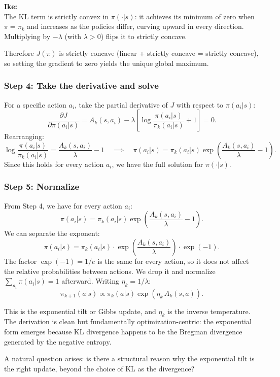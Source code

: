 \documentclass[11pt]{article}
\theoremstyle{definition}
\theoremstyle{remark}
\newenvironment{ike}{\color{blue}\textbf{Ike:}\\}{}
\begin{document}
\begin{ike}
The KL term is strictly convex in $\pi(\cdot|s)$: it achieves its minimum of zero when $\pi = \pi_k$ and increases as the policies differ, curving upward in every direction. Multiplying by $-\lambda$ (with $\lambda > 0$) flips it to strictly concave.

Therefore $J(\pi)$ is strictly concave (linear + strictly concave = strictly concave), so setting the gradient to zero yields the unique global maximum.

\subsubsection*{Step 4: Take the derivative and solve}

For a specific action $a_i$, take the partial derivative of $J$ with respect to $\pi(a_i|s)$:
\[
\frac{\partial J}{\partial \pi(a_i|s)} = A_k(s,a_i) - \lambda\left[\log \frac{\pi(a_i|s)}{\pi_k(a_i|s)} + 1\right] = 0.
\]
Rearranging:
\[
\log \frac{\pi(a_i|s)}{\pi_k(a_i|s)} = \frac{A_k(s,a_i)}{\lambda} - 1 \quad \implies \quad \pi(a_i|s) = \pi_k(a_i|s) \exp\!\left(\frac{A_k(s,a_i)}{\lambda} - 1\right).
\]
Since this holds for every action $a_i$, we have the full solution for $\pi(\cdot|s)$.

\subsubsection*{Step 5: Normalize}

From Step 4, we have for every action $a_i$:
\[
\pi(a_i|s) = \pi_k(a_i|s) \exp\!\left(\frac{A_k(s,a_i)}{\lambda} - 1\right).
\]
We can separate the exponent:
\[
\pi(a_i|s) = \pi_k(a_i|s) \cdot \exp\!\left(\frac{A_k(s,a_i)}{\lambda}\right) \cdot \exp(-1).
\]
The factor $\exp(-1) = 1/e$ is the same for every action, so it does not affect the relative probabilities between actions. We drop it and normalize $\sum_{a_i} \pi(a_i|s) = 1$ afterward. Writing $\eta_k = 1/\lambda$:
\[
\pi_{k+1}(a|s) \propto \pi_k(a|s) \exp\!\left(\eta_k\, A_k(s,a)\right).
\]

\end{ike}

This is the exponential tilt or Gibbs update, and $\eta_k$ is the inverse temperature. The derivation is clean but fundamentally optimization-centric: the exponential form emerges because KL divergence happens to be the Bregman divergence generated by the negative entropy.

A natural question arises: is there a structural reason why the exponential tilt is the right update, beyond the choice of KL as the divergence?
\end{document}
